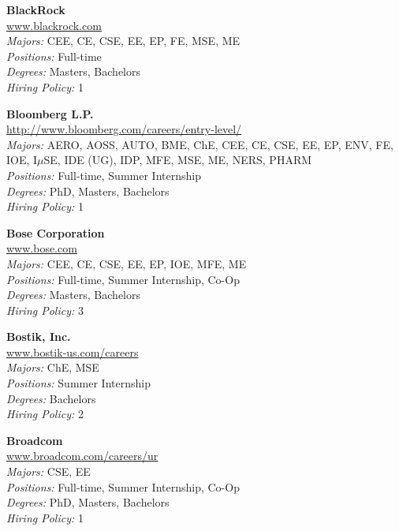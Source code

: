 \documentclass[twoside]{article}
\begin{document}
\begin{center}
\begin{multicols}{3}
\begin{minipage}{.9\columnwidth}{\Large\bf BlackRock }\\
	\url{www.blackrock.com}\\
	\emph{Majors:} CEE, CE, CSE, EE, EP, FE, MSE, ME\\
	\emph{Positions:} Full-time\\
	\emph{Degrees:} Masters, Bachelors\\
	\emph{Hiring Policy:} 1\\
\end{minipage}
 
\begin{minipage}{.9\columnwidth}{\Large\bf Bloomberg L.P. }\\
	\url{http://www.bloomberg.com/careers/entry-level/}\\
	\emph{Majors:} AERO, AOSS, AUTO, BME, ChE, CEE, CE, CSE, EE, EP, ENV, FE, IOE, I$\mu$SE, IDE (UG), IDP, MFE, MSE, ME, NERS, PHARM\\
	\emph{Positions:} Full-time, Summer Internship\\
	\emph{Degrees:} PhD, Masters, Bachelors\\
	\emph{Hiring Policy:} 1\\
\end{minipage}
 
\begin{minipage}{.9\columnwidth}{\Large\bf Bose Corporation }\\
	\url{www.bose.com}\\
	\emph{Majors:} CEE, CE, CSE, EE, EP, IOE, MFE, ME\\
	\emph{Positions:} Full-time, Summer Internship, Co-Op\\
	\emph{Degrees:} Masters, Bachelors\\
	\emph{Hiring Policy:} 3\\
\end{minipage}
 
\begin{minipage}{.9\columnwidth}{\Large\bf Bostik, Inc. }\\
	\url{www.bostik-us.com/careers}\\
	\emph{Majors:} ChE, MSE\\
	\emph{Positions:} Summer Internship\\
	\emph{Degrees:} Bachelors\\
	\emph{Hiring Policy:} 2\\
\end{minipage}
 
\begin{minipage}{.9\columnwidth}{\Large\bf Broadcom }\\
	\url{www.broadcom.com/careers/ur}\\
	\emph{Majors:} CSE, EE\\
	\emph{Positions:} Full-time, Summer Internship, Co-Op\\
	\emph{Degrees:} PhD, Masters, Bachelors\\
	\emph{Hiring Policy:} 1\\
\end{minipage}
 

\end{multicols}
\end{center}
\end{document}
